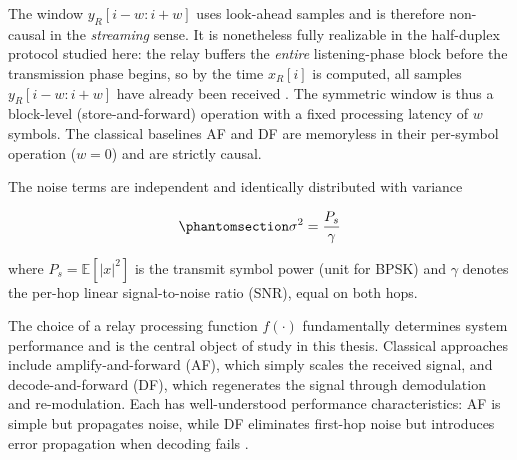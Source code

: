 \begin{remark}\label{rem:window-causality}
The window $y_R[i-w:i+w]$ uses look-ahead samples and is therefore non-causal in the \emph{streaming} sense. It is nonetheless fully realizable in the half-duplex protocol studied here: the relay buffers the \emph{entire} listening-phase block before the transmission phase begins, so by the time $x_R[i]$ is computed, all samples $y_R[i-w:i+w]$ have already been received . The symmetric window is thus a block-level (store-and-forward) operation with a fixed processing latency of $w$ symbols. The classical baselines AF and DF are memoryless in their per-symbol operation ($w=0$) and are strictly causal.
\end{remark}

The noise terms are independent and identically distributed with variance

\begin{equation}\protect\phantomsection\label{eq:awgn-sigma2}
\sigma^2 = \frac{P_s}{\gamma}
\end{equation}

where \(P_s = \mathbb{E}[|x|^2]\) is the transmit symbol power (unit for BPSK) and \(\gamma\) denotes the per-hop linear signal-to-noise ratio (SNR), equal on both hops.


The choice of a relay processing function \(f(\cdot)\) fundamentally determines system performance and is the central object of study in this thesis. Classical approaches include amplify-and-forward (AF), which simply scales the received signal, and decode-and-forward (DF), which regenerates the signal through demodulation and re-modulation. Each has well-understood performance characteristics: AF is simple but propagates noise, while DF eliminates first-hop noise but introduces error propagation when decoding fails \cite{CoverGamal1979RelayChannel}.

